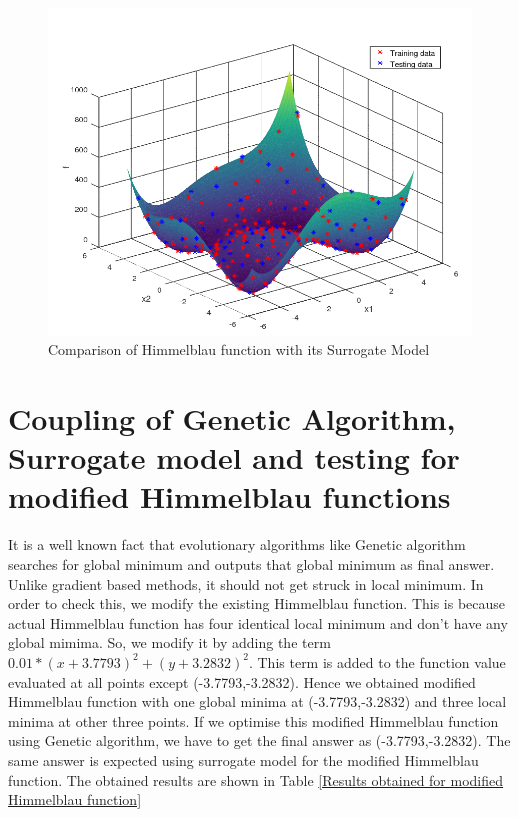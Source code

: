 \begin{figure}[H]
	\includegraphics[width=\textwidth]{optimization/Himmel_blau_fcn.png}
	\caption{Comparison of Himmelblau function with its Surrogate Model}
	\label{fig:Comparison of Himmelblau function with its Surrogate Model} %
\end{figure}

\section{Coupling of Genetic Algorithm, Surrogate model and testing for modified Himmelblau functions}
\label{Modified Himmelblau function}
It is a well known fact that evolutionary algorithms like Genetic algorithm searches for global minimum and outputs that global minimum as final answer. Unlike gradient based methods, it should not get struck in local minimum. In order to check this, we modify the existing Himmelblau function. This is because actual Himmelblau function has four identical local minimum and don't have any global mimima. So, we modify it by adding the term $  0.01* (x + 3.7793)^2 + (y + 3.2832)^2 $. This term is added to the function value evaluated at all points except (-3.7793,-3.2832). Hence we obtained modified Himmelblau function with one global minima at (-3.7793,-3.2832) and three local minima at other three points. If we optimise this modified Himmelblau function using Genetic algorithm, we have to get the final answer as (-3.7793,-3.2832). The same answer is expected using surrogate model for the modified Himmelblau function. The obtained results are shown in Table \ref{Results obtained for modified Himmelblau function}

